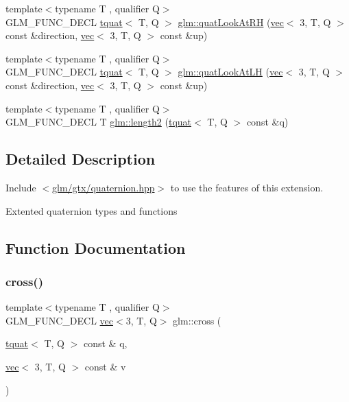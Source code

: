 \begin{DoxyCompactItemize}
\item 
{\footnotesize template$<$typename T , qualifier Q$>$ }\\G\+L\+M\+\_\+\+F\+U\+N\+C\+\_\+\+D\+E\+CL \hyperlink{structglm_1_1tquat}{tquat}$<$ T, Q $>$ \hyperlink{group__gtx__quaternion_gad30cbeb78315773b6d18d9d1c1c75b77}{glm\+::quat\+Look\+At\+RH} (\hyperlink{structglm_1_1vec}{vec}$<$ 3, T, Q $>$ const \&direction, \hyperlink{structglm_1_1vec}{vec}$<$ 3, T, Q $>$ const \&up)
\item 
{\footnotesize template$<$typename T , qualifier Q$>$ }\\G\+L\+M\+\_\+\+F\+U\+N\+C\+\_\+\+D\+E\+CL \hyperlink{structglm_1_1tquat}{tquat}$<$ T, Q $>$ \hyperlink{group__gtx__quaternion_ga6f1b3fba52fcab952d0ab523177ff443}{glm\+::quat\+Look\+At\+LH} (\hyperlink{structglm_1_1vec}{vec}$<$ 3, T, Q $>$ const \&direction, \hyperlink{structglm_1_1vec}{vec}$<$ 3, T, Q $>$ const \&up)
\item 
{\footnotesize template$<$typename T , qualifier Q$>$ }\\G\+L\+M\+\_\+\+F\+U\+N\+C\+\_\+\+D\+E\+CL T \hyperlink{group__gtx__quaternion_ga229bacc3051770b030042fe266f7b0cb}{glm\+::length2} (\hyperlink{structglm_1_1tquat}{tquat}$<$ T, Q $>$ const \&q)
\end{DoxyCompactItemize}


\subsection{Detailed Description}
Include $<$\hyperlink{gtx_2quaternion_8hpp}{glm/gtx/quaternion.\+hpp}$>$ to use the features of this extension.

Extented quaternion types and functions 

\subsection{Function Documentation}
\mbox{\label{group__gtx__quaternion_ga8639615408166d0dddda1b91a940b338}} 
\subsubsection{\texorpdfstring{cross()}{cross()}\hspace{0.1cm}{\footnotesize\ttfamily [1/2]}}
{\footnotesize\ttfamily template$<$typename T , qualifier Q$>$ \\
G\+L\+M\+\_\+\+F\+U\+N\+C\+\_\+\+D\+E\+CL \hyperlink{structglm_1_1vec}{vec}$<$3, T, Q$>$ glm\+::cross (\begin{DoxyParamCaption}\item[{\hyperlink{structglm_1_1tquat}{tquat}$<$ T, Q $>$ const \&}]{q,  }\item[{\hyperlink{structglm_1_1vec}{vec}$<$ 3, T, Q $>$ const \&}]{v }\end{DoxyParamCaption})}




